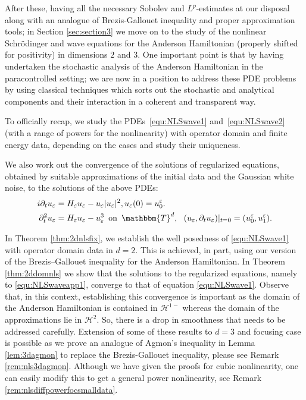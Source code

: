 \documentclass[11pt, oneside]{article}   	%
\newcommand{\tmop}[1]{\ensuremath{\operatorname{#1}}}
\newcommand{\ssp}{\mathscr{H}}
\begin{document}
After these, having all the  necessary Sobolev and $L^p$-estimates at our disposal along with an analogue of Brezis-Gallouet inequality and proper approximation tools; in Section \ref{sec:section3} we move on to the study of the nonlinear Schr\"odinger and wave equations for the Anderson Hamiltonian (properly shifted for positivity) in dimensions $2$ and $3$.  One important point is that by having undertaken the stochastic analysis of the Anderson Hamiltonian in the paracontrolled setting; we are now in a position to address these PDE problems by using classical techniques which sorts out the stochastic and analytical components and their interaction in a coherent and transparent way.

To officially recap, we study the PDEs~\eqref{equ:NLSwave1} and~\eqref{equ:NLSwave2} (with a range of powers for the nonlinearity) with operator domain and finite energy data, depending on the cases and study their uniqueness.

We also work out the convergence of the solutions of  regularized equations, obtained by suitable approximations of the initial data and the Gaussian white noise, to the solutions of the above PDEs:
\begin{align} 
i\partial_t u_{\varepsilon} &=  H_{\varepsilon} u_{\varepsilon}-u_\varepsilon|u_\varepsilon|^2, u_\varepsilon(0)=u^\varepsilon_0. \label{equ:NLSwaveapp1}\\ 
\partial^2_t u_{\varepsilon}  &=  H_{\varepsilon} u_{\varepsilon} - u_{\varepsilon}^3 \ \tmop{on} \  \mathbbm{T}^d , \ \  (u_{\varepsilon}, \partial_t u_{\varepsilon}) |_{t = 0}  =  (u^{\varepsilon}_0, u^{\varepsilon}_1). \label{equ:NLSwaveapp2}
\end{align}


In Theorem \ref{thm:2dnlsfix}, we establish the well posedness of \eqref{equ:NLSwave1} with  operator domain data in $d=2$.  This is achieved, in part, using our version of the Brezis--Gallouet inequality for the Anderson Hamiltonian.  In Theorem \ref{thm:2ddomnls} we show that the solutions to the regularized equations, namely to \eqref{equ:NLSwaveapp1}, converge to that of equation \eqref{equ:NLSwave1}.  Observe that, in this context, establishing this convergence is important as  the domain of the Anderson Hamiltonian is contained in $\ssp^{1-}$ whereas the domain of the approximations lie in $\ssp^{2}$.  So, there is a drop in smoothness that needs to be addressed carefully. Extension of some of these results to $d=3$ and focusing case  is possible as we prove an analogue of Agmon's inequality in Lemma \ref{lem:3dagmon} to replace the Brezis-Gallouet inequality, please see Remark \ref{rem:nls3dagmon}.  Although we have given the proofs for cubic nonlinearity, one can easily modify this to get a general power nonlinearity, see Remark \ref{rem:nlsdiffpowerfocsmalldata}.
\end{document}
